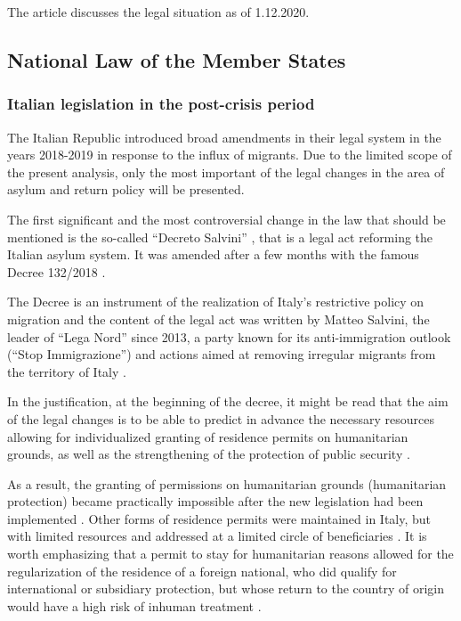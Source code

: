 \documentclass[10pt,a4paper]{article}
\begin{document}
\begin{multicols}{2}
The article discusses the legal situation as of 1.12.2020.

\subsection{National Law of the Member States}

\subsubsection{Italian legislation in the post-crisis period}

\noindent The Italian Republic introduced broad amendments in their legal system in the years 2018-2019 in response to the influx of migrants. Due to the limited scope of the present analysis, only the most important of the legal changes in the area of asylum and return policy will be presented.

The first significant and the most controversial change in the law that should be mentioned is the so-called ``Decreto Salvini'' \citep{R30}, that is a legal act reforming the Italian asylum system. It was amended after a few months with the famous Decree 132/2018 \citep{R31}.

The Decree is an instrument of the realization of Italy's restrictive policy on migration and the content of the legal act was written by Matteo Salvini, the leader of ``Lega Nord'' since 2013, a party known for its anti-immigration outlook (``Stop Immigrazione'') and actions aimed at removing irregular migrants from the territory of Italy \citep{R32}.

In the justification, at the beginning of the decree, it might be read that the aim of the legal changes is to be able to predict in advance the necessary resources allowing for individualized granting of residence permits on humanitarian grounds, as well as the strengthening of the protection of public security \citep{R33}.
 
As a result, the granting of permissions on humanitarian grounds (humanitarian protection) became practically impossible after the new legislation had been implemented \citep{R34,R35}. Other forms of residence permits were maintained in Italy, but with limited resources and addressed at a limited circle of beneficiaries \citep{R36,R37,R38}. It is worth emphasizing that a permit to stay for humanitarian reasons allowed for the regularization of the residence of a foreign national, who did qualify for international or subsidiary protection, but whose return to the country of origin would have a high risk of inhuman treatment \citep{R39}.


\end{multicols}
\end{document}
